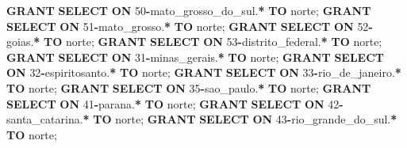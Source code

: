 \documentclass[
]{book}
\newenvironment{Shaded}{\begin{snugshade}}{\end{snugshade}}
\newcommand{\DecValTok}[1]{\textcolor[rgb]{0.00,0.00,0.81}{#1}}
\newcommand{\KeywordTok}[1]{\textcolor[rgb]{0.13,0.29,0.53}{\textbf{#1}}}
\newcommand{\NormalTok}[1]{#1}
\newcommand{\OperatorTok}[1]{\textcolor[rgb]{0.81,0.36,0.00}{\textbf{#1}}}
\newcommand{\StringTok}[1]{\textcolor[rgb]{0.31,0.60,0.02}{#1}}
\begin{document}
\begin{Shaded}
\begin{Highlighting}[]
\KeywordTok{GRANT} \KeywordTok{SELECT} \KeywordTok{ON}\NormalTok{ \textasciigrave{}}\DecValTok{50}\OperatorTok{{-}}\NormalTok{mato\_grosso\_do\_sul\textasciigrave{}.}\OperatorTok{*}  \KeywordTok{TO} \StringTok{\textquotesingle{}norte\textquotesingle{}}\NormalTok{;}
\KeywordTok{GRANT} \KeywordTok{SELECT} \KeywordTok{ON}\NormalTok{ \textasciigrave{}}\DecValTok{51}\OperatorTok{{-}}\NormalTok{mato\_grosso\textasciigrave{}.}\OperatorTok{*}        \KeywordTok{TO} \StringTok{\textquotesingle{}norte\textquotesingle{}}\NormalTok{;}
\KeywordTok{GRANT} \KeywordTok{SELECT} \KeywordTok{ON}\NormalTok{ \textasciigrave{}}\DecValTok{52}\OperatorTok{{-}}\NormalTok{goias\textasciigrave{}.}\OperatorTok{*}              \KeywordTok{TO} \StringTok{\textquotesingle{}norte\textquotesingle{}}\NormalTok{;}
\KeywordTok{GRANT} \KeywordTok{SELECT} \KeywordTok{ON}\NormalTok{ \textasciigrave{}}\DecValTok{53}\OperatorTok{{-}}\NormalTok{distrito\_federal\textasciigrave{}.}\OperatorTok{*}   \KeywordTok{TO} \StringTok{\textquotesingle{}norte\textquotesingle{}}\NormalTok{;}
\KeywordTok{GRANT} \KeywordTok{SELECT} \KeywordTok{ON}\NormalTok{ \textasciigrave{}}\DecValTok{31}\OperatorTok{{-}}\NormalTok{minas\_gerais\textasciigrave{}.}\OperatorTok{*}       \KeywordTok{TO} \StringTok{\textquotesingle{}norte\textquotesingle{}}\NormalTok{;}
\KeywordTok{GRANT} \KeywordTok{SELECT} \KeywordTok{ON}\NormalTok{ \textasciigrave{}}\DecValTok{32}\OperatorTok{{-}}\NormalTok{espiritosanto\textasciigrave{}.}\OperatorTok{*}      \KeywordTok{TO} \StringTok{\textquotesingle{}norte\textquotesingle{}}\NormalTok{;}
\KeywordTok{GRANT} \KeywordTok{SELECT} \KeywordTok{ON}\NormalTok{ \textasciigrave{}}\DecValTok{33}\OperatorTok{{-}}\NormalTok{rio\_de\_janeiro\textasciigrave{}.}\OperatorTok{*}     \KeywordTok{TO} \StringTok{\textquotesingle{}norte\textquotesingle{}}\NormalTok{;}
\KeywordTok{GRANT} \KeywordTok{SELECT} \KeywordTok{ON}\NormalTok{ \textasciigrave{}}\DecValTok{35}\OperatorTok{{-}}\NormalTok{sao\_paulo\textasciigrave{}.}\OperatorTok{*}          \KeywordTok{TO} \StringTok{\textquotesingle{}norte\textquotesingle{}}\NormalTok{;}
\KeywordTok{GRANT} \KeywordTok{SELECT} \KeywordTok{ON}\NormalTok{ \textasciigrave{}}\DecValTok{41}\OperatorTok{{-}}\NormalTok{parana\textasciigrave{}.}\OperatorTok{*}             \KeywordTok{TO} \StringTok{\textquotesingle{}norte\textquotesingle{}}\NormalTok{;}
\KeywordTok{GRANT} \KeywordTok{SELECT} \KeywordTok{ON}\NormalTok{ \textasciigrave{}}\DecValTok{42}\OperatorTok{{-}}\NormalTok{santa\_catarina\textasciigrave{}.}\OperatorTok{*}     \KeywordTok{TO} \StringTok{\textquotesingle{}norte\textquotesingle{}}\NormalTok{;}
\KeywordTok{GRANT} \KeywordTok{SELECT} \KeywordTok{ON}\NormalTok{ \textasciigrave{}}\DecValTok{43}\OperatorTok{{-}}\NormalTok{rio\_grande\_do\_sul\textasciigrave{}.}\OperatorTok{*}  \KeywordTok{TO} \StringTok{\textquotesingle{}norte\textquotesingle{}}\NormalTok{;}


\end{Highlighting}
\end{Shaded}
\end{document}
